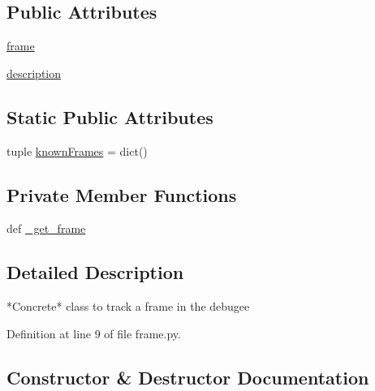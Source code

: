\subsection*{Public Attributes}
\begin{DoxyCompactItemize}
\item 
\hyperlink{classmemoryoracle_1_1frame_1_1Frame_a1c23d6d73253d8f94ecbf22fc811288e}{frame}
\item 
\hyperlink{classmemoryoracle_1_1frame_1_1Frame_a9d01f81afb9481cd3e8f4fa5b72f0e73}{description}
\end{DoxyCompactItemize}
\subsection*{Static Public Attributes}
\begin{DoxyCompactItemize}
\item 
tuple \hyperlink{classmemoryoracle_1_1frame_1_1Frame_acd184cbe6ec2c834edbc7e737d9985f7}{known\+Frames} = dict()
\end{DoxyCompactItemize}
\subsection*{Private Member Functions}
\begin{DoxyCompactItemize}
\item 
def \hyperlink{classmemoryoracle_1_1frame_1_1Frame_a87167c1140407937acbafc1fa866fc17}{\+\_\+get\+\_\+frame}
\end{DoxyCompactItemize}


\subsection{Detailed Description}
\begin{DoxyVerb}*Concrete* class to track a frame in the debugee
\end{DoxyVerb}
 

Definition at line 9 of file frame.\+py.



\subsection{Constructor \& Destructor Documentation}
\hypertarget{classmemoryoracle_1_1frame_1_1Frame_aea518e57d5d0c5c49b21a429586cecb6}{}
